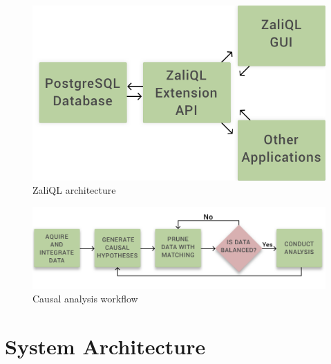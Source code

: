 \begin{figure}\center
 \includegraphics[scale=0.20]{Figures/System-Overview.png}
  \vspace{-3mm} \caption{ZaliQL architecture}

  \label{fig:arch}
  \vspace{-3mm}
\end{figure}

  \vspace*{-3mm}
\begin{figure} \center
  \includegraphics[scale=0.21]{Figures/Matching-Flowchart.png}
  \vspace*{-4mm}\caption{Causal analysis workflow}

\label{fig:flowchart}
\vspace{-0.3cm}
\end{figure}


\section{System Architecture}

